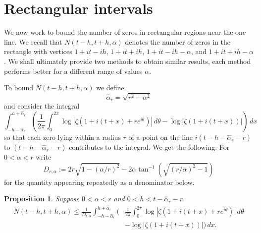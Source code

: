 \documentclass[10pt,english,letter, reqno]{amsart}
\theoremstyle{plain}
\newtheorem{proposition}[theorem]{Proposition}
\theoremstyle{definition}
\begin{document}
\section{Rectangular intervals}\label{sec:rectangularjensen}




We now work to bound the number of zeros in rectangular regions near the one line. We recall that $N(t-h,t+h,\alpha)$ denotes the number of zeros in the rectangle with vertices $1+it-ih$,  $1+it+ih$, $1+it-ih-\alpha$, and  $1+it+ih-\alpha$.
We shall ultimately provide two methods to obtain similar results, each method performs better for a different range of values $\alpha$.



To bound $N(t-h,t+h,\alpha)$ we define
\begin{equation}\label{eq:hatalpha} \hat{\alpha}_r = \sqrt{r^2-\alpha^2} \end{equation}
and consider the integral
\begin{equation}
    \int_{-h-\hat{\alpha}_r}^{h+\hat{\alpha}_r} \left(\frac{1}{2\pi}\int_0^{2\pi} \log|\zeta(1+i(t+x)+re^{i\theta})|\,d\theta - \log|\zeta(1+i(t+x))|\right)\,dx
\end{equation}
so that each zero lying within a radius $r$ of a point on the line $i(t-h-\hat{\alpha}_r-r)$ to $(t-h-\hat{\alpha}_r-r)$ contributes to the integral. We get the following:
 For $0<\alpha<r$ write
\[ D_{r,\alpha} := 2r\sqrt{1-(\alpha/r)^2}-2\alpha\tan^{-1}(\sqrt{(r/\alpha)^2-1}) \]
for the quantity appearing repeatedly as a denominator below.
\begin{proposition}\label{prop:jensenrectangle}
Suppose $0<\alpha<r$ and $0<h<t-\hat{\alpha}_r-r$.
\begin{align*} N(t-h,t+h,\alpha) \leq \frac{1}{D_{r,\alpha}}\int_{-h-\hat{\alpha}_r}^{h+\hat{\alpha}_r} \Biggl(&\frac{1}{2\pi}\int_0^{2\pi} \log|\zeta(1+i(t+x)+re^{i\theta})|\,d\theta
\\& - \log|\zeta(1+i(t+x))|\Biggr)\,dx.
\end{align*}
\end{proposition}
\end{document}
